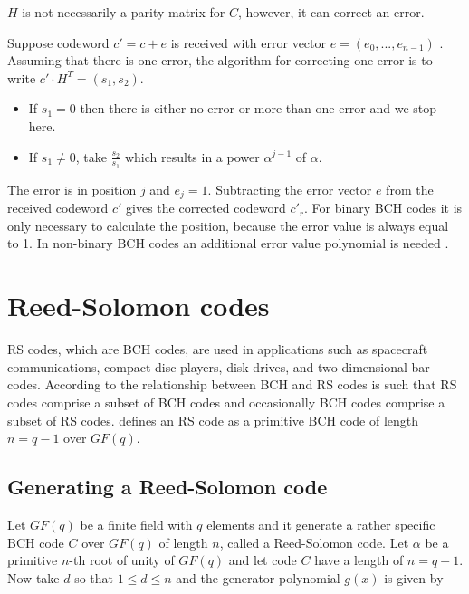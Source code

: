 \documentclass[../main.tex]{subfiles}
\begin{document}
    \noindent
    $H$ is not necessarily a parity matrix for $C$, however, it can correct an error.

    Suppose codeword $c'=c+e$ is received with error vector $e=(e_0, ..., e_{n-1})$ . Assuming that there is one error, the algorithm for correcting one error is to write $c' \cdot H^T = (s_1, s_2)$.

    \begin{itemize}
        \item If $s_1 = 0$ then there is either no error or more than one error and we stop here.
        \item If $s_1 \neq 0$, take $\frac{s_2}{s_1}$ which results in a power $\alpha^{j-1}$ of $\alpha$.
    \end{itemize}

    The error is in position $j$ and $e_j=1$. Subtracting the error vector $e$ from the received codeword $c'$ gives the corrected codeword $c'_r$. For binary BCH codes it is only necessary to calculate the position, because the error value is always equal to 1. In non-binary BCH codes an additional error value polynomial is needed \autocite{trappe2006introduction}.


    \section{Reed-Solomon codes}

    RS codes, which are BCH codes, are used in applications such as spacecraft communications, compact disc players, disk drives, and two-dimensional bar codes. According to \autocite{bossert1999channel} the relationship between BCH and RS codes is such that RS codes comprise a subset of BCH codes and occasionally BCH codes comprise a subset of RS codes. \autocite{lint1999introduction} defines an RS code as a primitive BCH code of length $n=q-1$ over $GF(q)$.


    \subsection{Generating a Reed-Solomon code}

    Let $GF(q)$ be a finite field with $q$ elements and it generate a rather specific BCH code $C$ over $GF(q)$ of length $n$, called a Reed-Solomon code. Let $\alpha$ be a primitive $n$-th root of unity of $GF(q)$ and let code $C$ have a length of $n=q-1$. Now take $d$ so that $1 \leq d \leq n$ and the generator polynomial $g(x)$ is given by
\end{document}

